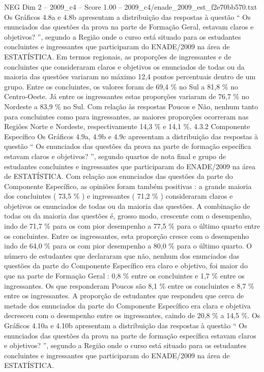 \begin{textsample}{NEG Dim 2 – 2009\_c4 – Score 1.00 – 2009\_c4/enade\_2009\_est\_f2e70bb570.txt}
Os Gráficos 4.8a e 4.8b apresentam a distribuição das respostas à questão “ Os enunciados das questões da prova na parte de Formação Geral, estavam claros e objetivos? ”, segundo a Região onde o curso está situado para os estudantes concluintes e ingressantes que participaram do ENADE/2009 na área de ESTATÍSTICA.
Em termos regionais, as proporções de ingressantes e de concluintes que consideraram claros e objetivos os enunciados de todas ou da maioria das questões variaram no máximo 12,4 pontos percentuais dentro de um grupo.
Entre os concluintes, os valores foram de 69,4 \% no Sul a 81,8 \% no Centro-Oeste.
Já entre os ingressantes estas proporções variaram de 76,7 \% no Nordeste a 83,9 \% no Sul.
Com relação às respostas Poucos e Não, nenhum tanto para concluintes como para ingressantes, as maiores proporções ocorreram nas Regiões Norte e Nordeste, respectivamente 14,3 \% e 14,1 \%. 4.3.2 Componente Específico Os Gráficos 4.9a, 4.9b e 4.9c apresentam a distribuição das respostas à questão “ Os enunciados das questões da prova na parte de formação específica estavam claros e objetivos? ”, segundo quartos de nota final e grupo de estudantes concluintes e ingressantes que participaram do ENADE/2009 na área de ESTATÍSTICA.
Com relação aos enunciados das questões da parte do Componente Específico, as opiniões foram também positivas : a grande maioria dos concluintes ( 73,5 \% ) e ingressantes ( 71,2 \% ) consideraram claros e objetivos os enunciados de todas ou da maioria das questões.
A combinação de todas ou da maioria das questões é, grosso modo, crescente com o desempenho, indo de 71,7 \% para os com pior desempenho a 77,5 \% para o último quarto entre os concluintes.
Entre os ingressantes, esta proporção cresce com o desempenho indo de 64,0 \% para os com pior desempenho a 80,0 \% para o último quarto.
O número de estudantes que declararam que não, nenhum dos enunciados das questões da parte do Componente Específico era claro e objetivo, foi maior do que na parte de Formação Geral : 0,8 \% entre os concluintes e 1,7 \% entre os ingressantes.
Os que responderam Poucos são 8,1 \% entre os concluintes e 8,7 \% entre os ingressantes.
A proporção de estudantes que respondeu que cerca de metade dos enunciados da parte do Componente Específico era clara e objetiva decresceu com o desempenho entre os ingressantes, caindo de 20,8 \% a 14,5 \%.
Os Gráficos 4.10a e 4.10b apresentam a distribuição das respostas à questão “ Os enunciados das questões da prova na parte de formação específica estavam claros e objetivos? ”, segundo a Região onde o curso está situado para os estudantes concluintes e ingressantes que participaram do ENADE/2009 na área de ESTATÍSTICA.

\end{textsample}
